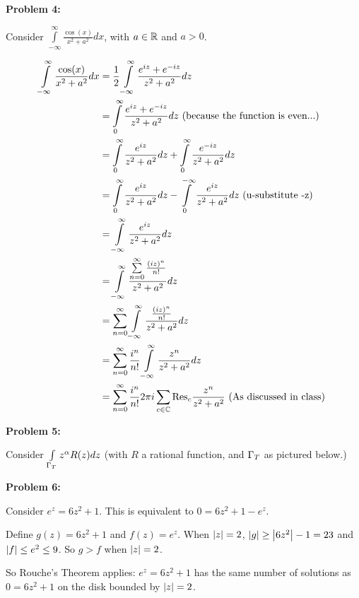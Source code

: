 \documentclass[a4paper,12pt]{article}
\begin{document}
\shunt

{\bf Problem 4:}

Consider $\int\limits_{-\infty}^\infty \frac{\cos(x)}{x^2+a^2} dx$, with $a \in \mathbb{R}$ and $a > 0$.

\begin{align*}
\int\limits_{-\infty}^\infty \frac{\cos(x)}{x^2+a^2} dx &= \frac{1}{2} \int\limits_{-\infty}^\infty \frac{e^{iz}+e^{-iz}}{z^2+a^2}dz\\
&=\int\limits_{0}^\infty \frac{e^{iz}+e^{-iz}}{z^2+a^2}dz \text{ (because the function is even...)}\\
&= \int\limits_{0}^\infty \frac{e^{iz}}{z^2+a^2}dz + \int\limits_{0}^\infty \frac{e^{-iz}}{z^2+a^2}dz\\
&= \int\limits_{0}^\infty \frac{e^{iz}}{z^2+a^2}dz - \int\limits_{0}^{-\infty} \frac{e^{iz}}{z^2+a^2}dz \text{ (u-substitute -z)} \\
&= \int\limits_{-\infty}^\infty \frac{e^{iz}}{z^2+a^2}dz \\
&= \int\limits_{-\infty}^\infty \frac{\sum\limits_{n=0}^\infty \frac{(iz)^n}{n!}}{z^2+a^2}dz \\
&= \sum\limits_{n=0}^\infty \int\limits_{-\infty}^\infty \frac{\frac{(iz)^n}{n!}}{z^2+a^2}dz \\
&= \sum\limits_{n=0}^\infty \frac{i^n}{n!} \int\limits_{-\infty}^\infty \frac{z^n}{z^2+a^2}dz \\
&= \sum\limits_{n=0}^\infty \frac{i^n}{n!} 2\pi i \sum\limits_{c \in \mathbb{C}} \text{Res}_c \frac{z^n}{z^2+a^2} \text{ (As discussed in class) } \\
\end{align*} %

\shunt

{\bf Problem 5:}

Consider $\int\limits_{\Gamma_T} z^\alpha R(z) dz$ (with $R$ a rational function, and $\Gamma_T$ as pictured below.)

\shunt %



\shunt

{\bf Problem 6:}

Consider $e^z = 6z^2 + 1$. This is equivalent to $0=6z^2 + 1 -e^z$.

Define $g(z) = 6z^2 +1$ and $f(z) = e^z$. When $\left\lvert z \right\rvert = 2$, $\left\lvert g \right\rvert \geq \left\lvert 6z^2 \right\rvert -1 = 23$ and $\left\lvert f \right\rvert \leq e^2 \leq 9$. So $g>f$ when $\left\lvert z \right\rvert = 2$.

So Rouche's Theorem applies: $e^z = 6z^2 +1$ has the same number of solutions as $0=6z^2 +1$ on the disk bounded by $\left\lvert z \right\rvert = 2$.
\end{document}
